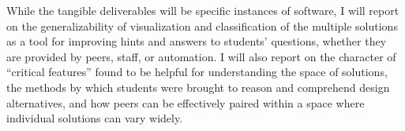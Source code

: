 \documentclass[12pt]{article}
\begin{document}



While the tangible deliverables will be specific instances of software, I will report on the generalizability of visualization and classification of the multiple solutions as a tool for improving hints and answers to students' questions, whether they are provided by peers, staff, or automation. I will also report on the character of ``critical features'' found to be helpful for understanding the space of solutions, the methods by which students were brought to reason and comprehend design alternatives, and how peers can be effectively paired within a space where individual solutions can vary widely.

%
%
%
%

\end{document}
